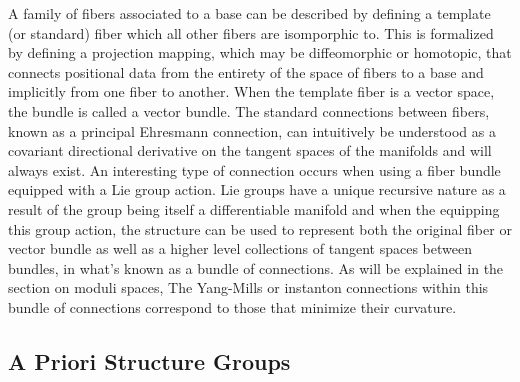 \documentclass{article}
\begin{document}
    A family of fibers associated to a base can be described by defining a template (or standard) fiber which all other fibers are isomporphic to. This is formalized by defining a projection mapping, which may be diffeomorphic or homotopic, that connects positional data from the entirety of the space of fibers to a base and implicitly from one fiber to another. When the template fiber is a vector space, the bundle is called a vector bundle. The standard connections between fibers, known as a principal Ehresmann connection, can intuitively be understood as a covariant directional derivative on the tangent spaces of the manifolds and will always exist. An interesting type of connection occurs when using a fiber bundle equipped with a Lie group action. Lie groups have a unique recursive nature as a result of the group being itself a differentiable manifold and when the equipping this group action, the structure can be used to represent both the original fiber or vector bundle as well as a higher level collections of tangent spaces between bundles, in what's known as a bundle of connections. As will be explained in the section on moduli spaces, The Yang-Mills or instanton connections within this bundle of connections correspond to those that minimize their curvature. 
    
    

\subsection{A Priori Structure Groups}
    
    
\end{document}
